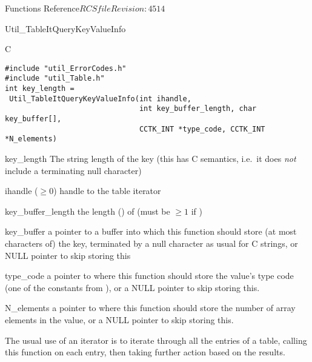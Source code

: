 \begin{cactuspart}{ Functions Reference}{$RCSfile$}{$Revision: 4514 $}
\begin{FunctionDescription}{Util\_TableItQueryKeyValueInfo}
\begin{SynopsisSection}
\begin{Synopsis}{C}
\begin{verbatim}
#include "util_ErrorCodes.h"
#include "util_Table.h"
int key_length =
 Util_TableItQueryKeyValueInfo(int ihandle,
                               int key_buffer_length, char key_buffer[],
                               CCTK_INT *type_code, CCTK_INT *N_elements)
\end{verbatim}
\end{Synopsis}
\end{SynopsisSection}

\begin{ResultSection}
\begin{Result}{key\_length}
The string length of the key
(this has C  semantics, i.e.\ it does {\em not\/}
include a terminating null character)
\end{Result}
\end{ResultSection}

\begin{ParameterSection}
\begin{Parameter}{ihandle ($\ge 0$)}
handle to the table iterator
\end{Parameter}
\begin{Parameter}{key\_buffer\_length}
\quad
the length () of 
(must be $\ge 1$ if )
\end{Parameter}
\begin{Parameter}{key\_buffer}
a pointer to a buffer into which this function should store
(at most  characters of) the key,
terminated by a null character as usual for C strings,
or NULL pointer to skip storing this
\end{Parameter}
\begin{Parameter}{type\_code}
a pointer to where this function should store the value's type code
(one of the  constants from ),
or a NULL pointer to skip storing this.
\end{Parameter}
\begin{Parameter}{N\_elements}
a pointer to where this function should store
the number of array elements in the value,
or a NULL pointer to skip storing this.
\end{Parameter}
\end{ParameterSection}

\begin{Discussion}
The usual use of an iterator is to iterate through all the entries
of a table, calling this function on each entry, then taking further
action based on the results.


\end{Discussion}
\end{FunctionDescription}
\end{cactuspart}
